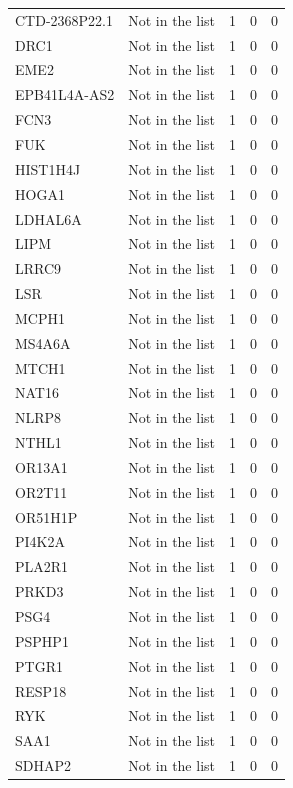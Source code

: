 \documentclass[12pt,twoside]{reedthesis}
\theoremstyle{definition}
\theoremstyle{definition}
\theoremstyle{remark}
\begin{document}
\begin{longtable}[t]{llrrr}
  \addlinespace
  CTD-2368P22.1 & Not in the list & 1 & 0 & 0\\
  DRC1 & Not in the list & 1 & 0 & 0\\
  EME2 & Not in the list & 1 & 0 & 0\\
  EPB41L4A-AS2 & Not in the list & 1 & 0 & 0\\
  FCN3 & Not in the list & 1 & 0 & 0\\
  \addlinespace
  FUK & Not in the list & 1 & 0 & 0\\
  HIST1H4J & Not in the list & 1 & 0 & 0\\
  HOGA1 & Not in the list & 1 & 0 & 0\\
  LDHAL6A & Not in the list & 1 & 0 & 0\\
  LIPM & Not in the list & 1 & 0 & 0\\
  \addlinespace
  LRRC9 & Not in the list & 1 & 0 & 0\\
  LSR & Not in the list & 1 & 0 & 0\\
  MCPH1 & Not in the list & 1 & 0 & 0\\
  MS4A6A & Not in the list & 1 & 0 & 0\\
  MTCH1 & Not in the list & 1 & 0 & 0\\
  \addlinespace
  NAT16 & Not in the list & 1 & 0 & 0\\
  NLRP8 & Not in the list & 1 & 0 & 0\\
  NTHL1 & Not in the list & 1 & 0 & 0\\
  OR13A1 & Not in the list & 1 & 0 & 0\\
  OR2T11 & Not in the list & 1 & 0 & 0\\
  \addlinespace
  OR51H1P & Not in the list & 1 & 0 & 0\\
  PI4K2A & Not in the list & 1 & 0 & 0\\
  PLA2R1 & Not in the list & 1 & 0 & 0\\
  PRKD3 & Not in the list & 1 & 0 & 0\\
  PSG4 & Not in the list & 1 & 0 & 0\\
  \addlinespace
  PSPHP1 & Not in the list & 1 & 0 & 0\\
  PTGR1 & Not in the list & 1 & 0 & 0\\
  RESP18 & Not in the list & 1 & 0 & 0\\
  RYK & Not in the list & 1 & 0 & 0\\
  SAA1 & Not in the list & 1 & 0 & 0\\
  \addlinespace
  SDHAP2 & Not in the list & 1 & 0 & 0\\

\end{longtable}
\end{document}
